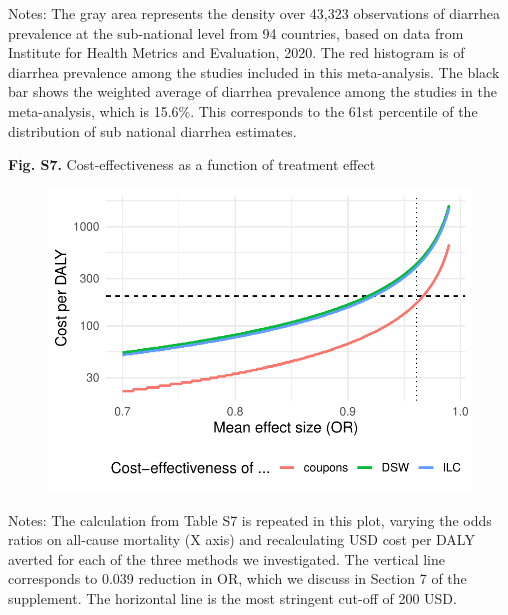 \documentclass[12pt]{article}
\begin{document}
{\noindent\fontsize{10}{10}\selectfont Notes: The gray area represents the density over 43,323 observations of diarrhea prevalence at the sub-national level from 94 countries, based on data from Institute for Health Metrics and Evaluation, 2020. The red histogram is of diarrhea prevalence among the studies included in this meta-analysis. The black bar shows the weighted average of diarrhea prevalence among the studies in the meta-analysis, which is 15.6\%. This corresponds to the 61st percentile of the distribution of sub national diarrhea estimates.}

\newpage
\noindent\textbf{Fig. S7.} Cost-effectiveness as a function of treatment effect
\begin{figure}[H]
    \centering
    \includegraphics{figures/cea_or_relationship.pdf}
\end{figure}

{\noindent\fontsize{10}{10}\selectfont Notes: The calculation from Table S7 is repeated in this plot, varying the odds ratios on all-cause mortality (X axis) and recalculating USD cost per DALY averted for each of the three methods we investigated. The vertical line corresponds to 0.039 reduction in OR, which we discuss in Section 7 of the supplement. The horizontal line is the most stringent cut-off of 200 USD.}
\end{document}

